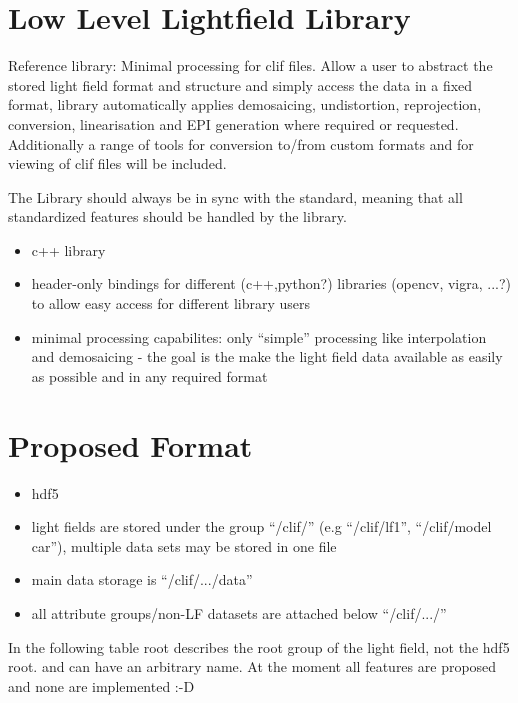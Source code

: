 \documentclass[a4paper,10pt]{article}
\begin{document}
\section{Low Level Lightfield Library}

Reference library: Minimal processing for clif files. Allow a user to abstract the stored light field format and structure and simply access the data in a fixed format, library automatically applies demosaicing, undistortion, reprojection, conversion, linearisation and EPI generation where required or requested. Additionally a range of tools for conversion to/from custom formats and for viewing of clif files will be included.

The Library should always be in sync with the standard, meaning that all standardized features should be handled by the library.

\begin{itemize}
 \item c++ library
 \item header-only bindings for different (c++,python?) libraries (opencv, vigra, ...?) to allow easy access for different library users
 \item minimal processing capabilites: only ``simple'' processing like interpolation and demosaicing - the goal is the make the light field data available as easily as possible and in any required format
\end{itemize}

\section{Proposed Format}

\begin{itemize}
 \item hdf5
 \item light fields are stored under the group ``/clif/'' (e.g ``/clif/lf1'', ``/clif/model car''), multiple data sets may be stored in one file
 \item main data storage is ``/clif/.../data''
 \item all attribute groups/non-LF datasets are attached below ``/clif/.../''
\end{itemize}

In the following table root describes the root group of the light field, not the hdf5 root. and can have an arbitrary name.
At the moment all features are proposed and none are implemented :-D
\end{document}
